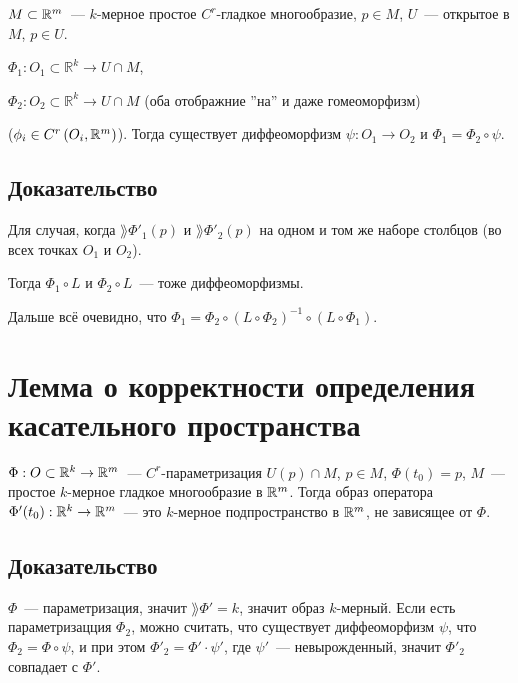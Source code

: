\documentclass{article}
\begin{document}
        $M \subset \mathbb{R}^m$~--- $k$-мерное простое $C^r$-гладкое многообразие, $p \in M$, $U$~--- открытое в $M$, $p \in U$.
        
        $\Phi_1 : O_1 \subset \mathbb{R}^k \rightarrow U \cap M$,
        
        $\Phi_2 : O_2 \subset \mathbb{R}^k \rightarrow U \cap M$ (оба отображние ''на'' и даже гомеоморфизм)
        
        ($\phi_i \in C^r \left( O_i, \mathbb{R}^m \right)$). Тогда существует диффеоморфизм $\psi : O_1 \rightarrow O_2$ и $\Phi_1 = \Phi_2 \circ \psi$.
        
        \subsection{Доказательство}
        
            Для случая, когда $\rang \Phi'_1(p)$ и $\rang \Phi'_2(p)$ на одном и том же наборе столбцов (во всех точках $O_1$ и $O_2$).
            
            Тогда $\Phi_1 \circ L$ и $\Phi_2 \circ L$~--- тоже диффеоморфизмы.
            
            Дальше всё очевидно, что $\Phi_1 = \Phi_2 \circ \left( L \circ \Phi_2 \right)^{-1} \circ \left( L \circ \Phi_1 \right)$.
            
    \newpage
    
    \section{Лемма о корректности определения касательного пространства}
    
        $\Phi : O \subset \mathbb{R}^k \rightarrow \mathbb{R}^m$~--- $C^r$-параметризация $U(p) \cap M$, $p \in M$, $\Phi(t_0) = p$, $M$~--- простое $k$-мерное гладкое многообразие в $\mathbb{R}^m$. Тогда образ оператора $\Phi'(t_0) : \mathbb{R}^k \rightarrow \mathbb{R}^m$~--- это $k$-мерное подпространство в $\mathbb{R}^m$, не зависящее от $\Phi$.
        
        \subsection{Доказательство}
        
            $\Phi$~--- параметризация, значит $\rang \Phi' = k$, значит образ $k$-мерный. Если есть параметризацция $\Phi_2$, можно считать, что существует диффеоморфизм $\psi$, что $\Phi_2 = \Phi \circ \psi$, и при этом $\Phi'_2 = \Phi' \cdot \psi'$, где $\psi'$~--- невырожденный, значит $\Phi'_2$ совпадает с $\Phi'$.
            
\end{document}
